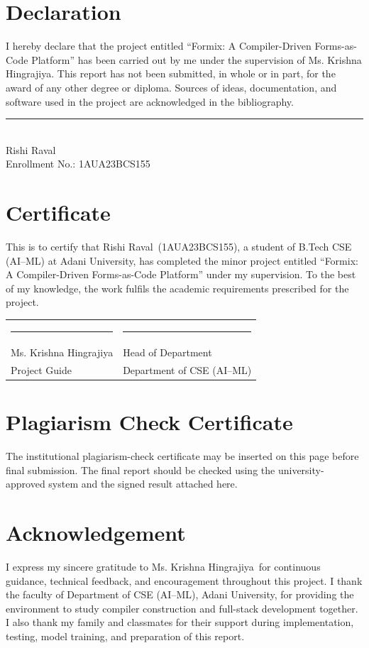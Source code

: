 \documentclass[12pt,a4paper,oneside]{report}
\newcommand{\student}{Rishi Raval}
\newcommand{\enrolment}{1AUA23BCS155}
\newcommand{\guide}{Ms. Krishna Hingrajiya}
\newcommand{\department}{Department of CSE (AI--ML)}
\newcommand{\university}{Adani University}
\newcommand{\signatureline}[1]{\par\vspace{13mm}\noindent\rule{60mm}{0.4pt}\\#1}
\begin{document}
\chapter*{Declaration}
I hereby declare that the project entitled ``Formix: A Compiler-Driven Forms-as-Code
Platform'' has been carried out by me under the supervision of \guide. This report has not
been submitted, in whole or in part, for the award of any other degree or diploma. Sources of
ideas, documentation, and software used in the project are acknowledged in the bibliography.
\signatureline{\student\\Enrollment No.: \enrolment}

\chapter*{Certificate}
This is to certify that \student\ (\enrolment), a student of B.Tech CSE (AI--ML) at
\university, has completed the minor project entitled ``Formix: A Compiler-Driven
Forms-as-Code Platform'' under my supervision. To the best of my knowledge, the work fulfils
the academic requirements prescribed for the project.
\vspace{15mm}
\begin{tabularx}{\textwidth}{@{}X X@{}}
\rule{50mm}{0.4pt} & \rule{50mm}{0.4pt}\\
\guide & Head of Department\\
Project Guide & \department
\end{tabularx}

\chapter*{Plagiarism Check Certificate}
The institutional plagiarism-check certificate may be inserted on this page before final
submission. The final report should be checked using the university-approved system and the
signed result attached here.

\chapter*{Acknowledgement}
I express my sincere gratitude to \guide\ for continuous guidance, technical feedback, and
encouragement throughout this project. I thank the faculty of \department, \university, for
providing the environment to study compiler construction and full-stack development together.
I also thank my family and classmates for their support during implementation, testing, model
training, and preparation of this report.
\end{document}
